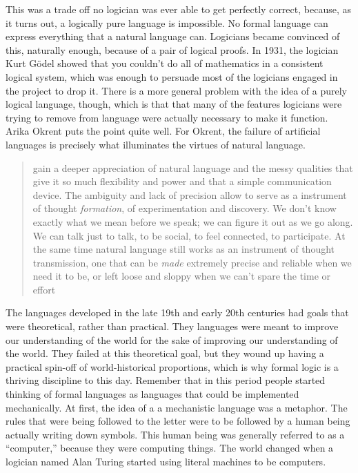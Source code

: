 This was a trade off no logician was ever able to get perfectly correct, because, as it turns out, a logically pure language is impossible. No formal language can express everything that a natural language can. Logicians became convinced of this, naturally enough, because of a pair of logical proofs. In 1931, the logician Kurt G\"{o}del showed that you couldn't do all of mathematics in a consistent logical system, which was enough to persuade most of the logicians engaged in the project to drop it. There is a more general problem with the idea of a purely logical language, though, which is that that many of the features logicians were trying to remove from language were actually necessary to make it function. Arika Okrent puts the point quite well. For Okrent, the failure of artificial languages is precisely what illuminates the virtues of natural language.

\begin{quotation} gain a deeper appreciation of natural language and the messy qualities that give it so much flexibility and power and that a simple communication device. The ambiguity and lack of precision allow to serve as a instrument of thought \textit{formation}, of experimentation and discovery. We don't know exactly what we mean before we speak; we can figure it out as we go along. We can talk just to talk, to be social, to feel connected, to participate. At the same time natural language still works as an instrument of thought transmission, one that can be \textit{made} extremely precise and reliable when we need it to be, or left loose and sloppy when we can't spare the time or effort \citep{Okrent2009} \end{quotation}

The languages developed in the late 19th and early 20th centuries had goals that were theoretical, rather than practical. They languages were meant to improve our understanding of the world for the sake of improving our understanding of the world. They failed at this theoretical goal, but they wound up having a practical spin-off of world-historical proportions, which is why formal logic is a thriving discipline to this day. Remember that in this period people started thinking of formal languages as languages that could be implemented mechanically. At first, the idea of a a mechanistic language was a metaphor. The rules that were being followed to the letter were to be followed by a human being actually writing down symbols. This human being was generally referred to as a ``computer,'' because they were computing things. The world changed when a logician named Alan Turing started using literal machines to be computers.

